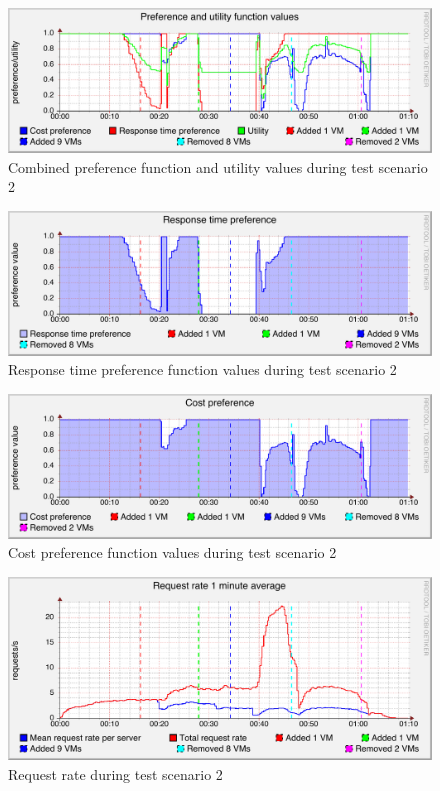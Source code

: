 \documentclass[english]{tktltiki2}
\theoremstyle{definition}
\theoremstyle{remark}
\begin{document}
\begin{figure}[htbp]
	\includegraphics[width=\textwidth]{images/preferencesgraph-test23}
	\caption{Combined preference function and utility values during test scenario 2}
	\label{fig:preferencesScenario2}
\end{figure}

\begin{figure}[htbp]
	\includegraphics[width=\textwidth]{images/responsetimepreferencegraph-test23}
	\caption{Response time preference function values during test scenario 2}
	\label{fig:responseTimePreferenceScenario2}
\end{figure}

\begin{figure}[htbp]
	\includegraphics[width=\textwidth]{images/costpreferencegraph-test23}
	\caption{Cost preference function values during test scenario 2}
	\label{fig:costPreferenceScenario2}
\end{figure}

\begin{figure}[htbp]
	\includegraphics[width=\textwidth]{images/requestrategraph-test23}
	\caption{Request rate during test scenario 2}
	\label{fig:requestRateScenario2}
\end{figure}
\end{document}
